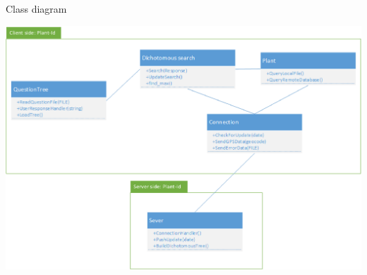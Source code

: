 \documentclass{beamer}
\begin{document}
\begin{frame}{Class diagram}
\begin{center}\includegraphics[scale=.48]{UML.eps}\end{center}
\end{frame}
\end{document}
